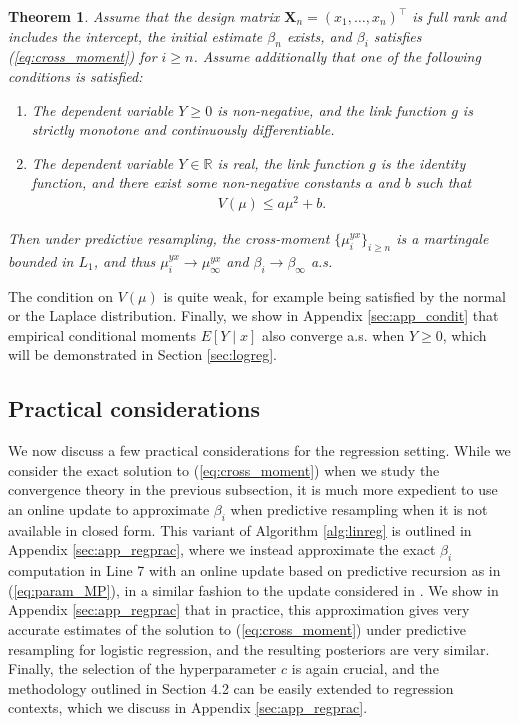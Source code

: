 \documentclass[11pt,a4paper]{article}
\theoremstyle{plain}
\newtheorem{theorem}{Theorem}
\theoremstyle{remark}
\theoremstyle{remark}
\begin{document}
\begin{theorem}\label{theo:reg}
Assume that the design matrix $\mathbf{X}_n = (x_1,\ldots,x_n)^\top$ is full rank and includes the intercept, the initial estimate $\beta_n$ exists, and $\beta_i$ satisfies (\ref{eq:cross_moment}) for $i \geq n$. Assume additionally that one of the following conditions is satisfied:
\begin{enumerate}
    \item The dependent variable $Y\geq 0$ is non-negative, and the link function $g$ is strictly monotone and continuously differentiable. 
    \item The dependent variable $Y\in \mathbb{R}$ is real, the link function $g$ is the identity function, and there exist some non-negative constants $a$ and $b$ such that
    \begin{align*}
   V(\mu) \leq a \mu^2 + b. 
\end{align*}
\end{enumerate}\vspace{-2mm}
Then under predictive resampling, the cross-moment $\{\mu_i^{yx}\}_{i \geq n}$ is a martingale bounded in $L_1$, and thus $\mu_i^{yx} \to \mu_\infty^{yx}$ and $\beta_i\to \beta_\infty$ a.s. 
\end{theorem}

The condition on $V(\mu)$ is quite weak, for example being satisfied by the normal or the Laplace distribution.
Finally, we show in Appendix \ref{sec:app_condit} that empirical conditional moments $E[Y \mid x]$ also converge a.s. when $Y \geq 0$, which will be demonstrated in Section \ref{sec:logreg}. 



\subsection{Practical considerations}\label{sec:reg_prac}
We now discuss a few practical considerations for the regression setting.
While we consider the exact solution to (\ref{eq:cross_moment}) when we study the convergence theory in the previous subsection, it is much more expedient to use an online update to approximate $\beta_i$ when predictive resampling when it is not available in closed form. This variant of Algorithm \ref{alg:linreg} is outlined in Appendix \ref{sec:app_regprac}, where we instead approximate the exact $\beta_i$ computation in Line 7 with an online update based on predictive recursion as in (\ref{eq:param_MP}), in a similar fashion to the update considered in \cite{fong2024asymptotics}. We show in  Appendix \ref{sec:app_regprac} that in practice, this approximation gives very accurate estimates of the solution to (\ref{eq:cross_moment}) under predictive resampling for logistic regression, and the resulting posteriors are very similar.  Finally, the selection of the hyperparameter $c$ is again crucial, and the methodology outlined in Section 4.2 can be easily extended to regression contexts, which we discuss in Appendix \ref{sec:app_regprac}.
\end{document}
